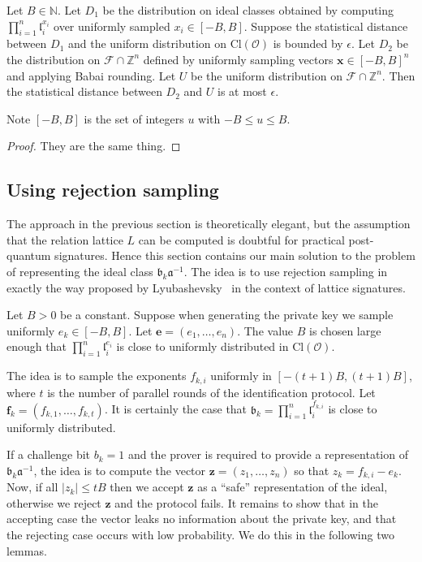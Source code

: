 \documentclass{llncs}
\newcommand{\FF}{\mathcal{F}}
\newcommand{\N}{\mathbb{N}}
\newcommand{\OO}{\mathcal{O}}
\newcommand{\Z}{\mathbb{Z}}
\newcommand{\Cl}{\text{Cl}}
\renewcommand{\a}{\mathfrak{a}}
\renewcommand{\b}{\mathfrak{b}}
\renewcommand{\l}{\mathfrak{l}}
\newcommand{\e}{\textbf{e}}
\newcommand{\f}{\textbf{f}}
\newcommand{\x}{\textbf{x}}
\newcommand{\z}{\textbf{z}}
\begin{document}
\begin{lemma} \label{lem:sim1}
Let $B \in \N$. Let $D_1$ be the distribution on ideal classes obtained by computing $\prod_{i=1}^n \l_i^{x_i}$ over uniformly sampled $x_i \in [-B,B]$.
Suppose the statistical distance between $D_1$ and the uniform distribution on $\Cl(\OO)$ is bounded by $\epsilon$.
Let $D_2$ be the distribution on $\FF \cap \Z^n$ defined by uniformly sampling vectors $\x \in [-B,B]^n$ and applying Babai rounding.
Let $U$ be the uniform distribution on $\FF \cap \Z^n$.
Then the statistical distance between $D_2$ and $U$ is at most $\epsilon$.
\end{lemma}

Note $[-B,B]$ is the set of integers $u$ with $-B \le u \le B$.


\begin{proof}
They are the same thing.
\end{proof}




\subsection{Using rejection sampling}

The approach in the previous section is theoretically elegant, but the assumption that the relation lattice $L$ can be computed is doubtful for practical post-quantum signatures.
Hence this section contains our main solution to the problem of representing the ideal class $\b_k \a^{-1}$.
The idea is to use rejection sampling in exactly the way proposed by Lyubashevsky~\cite{Lyu09} in the context of lattice signatures.

Let $B > 0$ be a constant. Suppose when generating the private key we sample uniformly $e_k \in [-B, B]$. Let $\e = ( e_1, \dots, e_n )$.
The value $B$ is chosen large enough that $\prod_{i=1}^n \l_i^{e_i}$ is close to uniformly distributed in $\Cl(\OO)$.

The idea is to sample the exponents $ f_{k,i} $ uniformly in $[-(t+1)B, (t+1)B]$, where $t$ is the number of parallel rounds of the identification protocol.
Let $\f_k = (f_{k,1}, \dots, f_{k,t} )$.
It is certainly the case that $\b_k = \prod_{i=1}^n \l_i^{f_{k,i}}$ is close to uniformly distributed.

If a challenge bit $b_k = 1$ and the prover is required to provide a representation of $\b_k \a^{-1}$, the idea is to compute the vector $\z = (z_1, \dots, z_n) $ so that $z_k = f_{k,i} - e_k $.
Now, if all $|z_k| \le tB$ then we accept $\z$ as a ``safe'' representation of the ideal, otherwise we reject $\z$ and the protocol fails.
It remains to show that in the accepting case the vector leaks no information about the private key, and that the rejecting case occurs with low probability. We do this in the following two lemmas.
\end{document}
